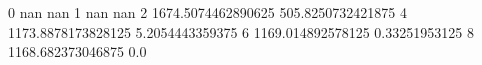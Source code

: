 0 nan nan
1 nan nan
2 1674.5074462890625 505.8250732421875
4 1173.8878173828125 5.2054443359375
6 1169.014892578125 0.33251953125
8 1168.682373046875 0.0
